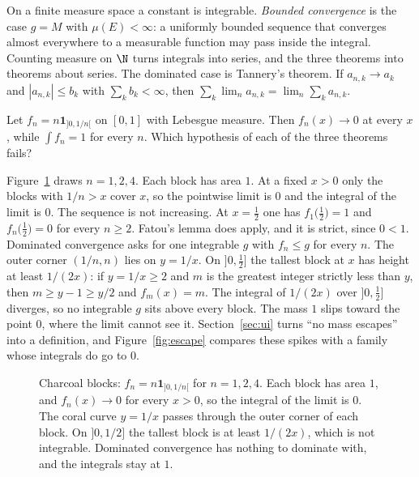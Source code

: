 On a finite measure space a constant is integrable. \emph{Bounded convergence} is the case \(g=M\) with \(\mu(E)<\infty\): a uniformly bounded sequence that converges almost everywhere to a measurable function may pass inside the integral. Counting measure on \(\N\) turns integrals into series, and the three theorems into theorems about series. The dominated case is Tannery's theorem. If \(a_{n,k}\to a_k\) and \(|a_{n,k}|\le b_k\) with \(\sum_kb_k<\infty\), then \(\sum_k\lim_na_{n,k}=\lim_n\sum_ka_{n,k}\).

\begin{think}
Let \(f_n=n\mathbf 1_{]0,1/n[}\) on \([0,1]\) with Lebesgue measure. Then \(f_n(x)\to0\) at every \(x\), while \(\int f_n=1\) for every \(n\). Which hypothesis of each of the three theorems fails?
\end{think}

Figure~\ref{fig:v7c08nodom} draws \(n=1,2,4\). Each block has area \(1\). At a fixed \(x>0\) only the blocks with \(1/n>x\) cover \(x\), so the pointwise limit is \(0\) and the integral of the limit is \(0\). The sequence is not increasing. At \(x=\frac12\) one has \(f_1\bigl(\frac12\bigr)=1\) and \(f_n\bigl(\frac12\bigr)=0\) for every \(n\ge2\). Fatou's lemma does apply, and it is strict, since \(0<1\). Dominated convergence asks for one integrable \(g\) with \(f_n\le g\) for every \(n\). The outer corner \((1/n,n)\) lies on \(y=1/x\). On \(]0,\frac12]\) the tallest block at \(x\) has height at least \(1/(2x)\): if \(y=1/x\ge2\) and \(m\) is the greatest integer strictly less than \(y\), then \(m\ge y-1\ge y/2\) and \(f_m(x)=m\). The integral of \(1/(2x)\) over \(]0,\frac12]\) diverges, so no integrable \(g\) sits above every block. The mass \(1\) slips toward the point \(0\), where the limit cannot see it. Section~\ref{sec:ui} turns ``no mass escapes'' into a definition, and Figure~\ref{fig:escape} compares these spikes with a family whose integrals do go to \(0\).

\begin{figure}[ht]
\centering
{}
\caption{Charcoal blocks: \(f_n=n\mathbf 1_{]0,1/n[}\) for \(n=1,2,4\). Each block has area \(1\), and \(f_n(x)\to0\) for every \(x>0\), so the integral of the limit is \(0\). The coral curve \(y=1/x\) passes through the outer corner of each block. On \(]0,1/2]\) the tallest block is at least \(1/(2x)\), which is not integrable. Dominated convergence has nothing to dominate with, and the integrals stay at \(1\).}
\label{fig:v7c08nodom}
\end{figure}

